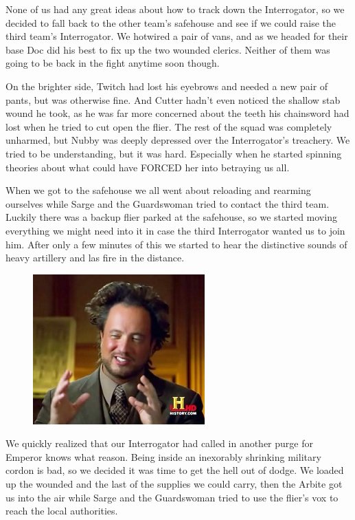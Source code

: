 None of us had any great ideas about how to track down the Interrogator, so we decided to fall back to the other team’s safehouse and see if we could raise the third team’s Interrogator. 
We hotwired a pair of vans, and as we headed for their base Doc did his best to fix up the two wounded clerics. 
Neither of them was going to be back in the fight anytime soon though. 

On the brighter side, Twitch had lost his eyebrows and needed a new pair of pants, but was otherwise fine. 
And Cutter hadn’t even noticed the shallow stab wound he took, as he was far more concerned about the teeth his chainsword had lost when he tried to cut open the flier. 
The rest of the squad was completely unharmed, but Nubby was deeply depressed over the Interrogator’s treachery. 
We tried to be understanding, but it was hard. Especially when he started spinning theories about what could have FORCED her into betraying us all.

When we got to the safehouse we all went about reloading and rearming ourselves while Sarge and the Guardswoman tried to contact the third team. 
Luckily there was a backup flier parked at the safehouse, so we started moving everything we might need into it in case the third Interrogator wanted us to join him. 
After only a few minutes of this we started to hear the distinctive sounds of heavy artillery and las fire in the distance.

\begin{figure}
	\begin{center}
		\includegraphics[width=\figwidth]{pics/5/25.png}
	\end{center}
\end{figure}
We quickly realized that our Interrogator had called in another purge for Emperor knows what reason. 
Being inside an inexorably shrinking military cordon is bad, so we decided it was time to get the hell out of dodge. 
We loaded up the wounded and the last of the supplies we could carry, then the Arbite got us into the air while Sarge and the Guardswoman tried to use the flier’s vox to reach the local authorities.

